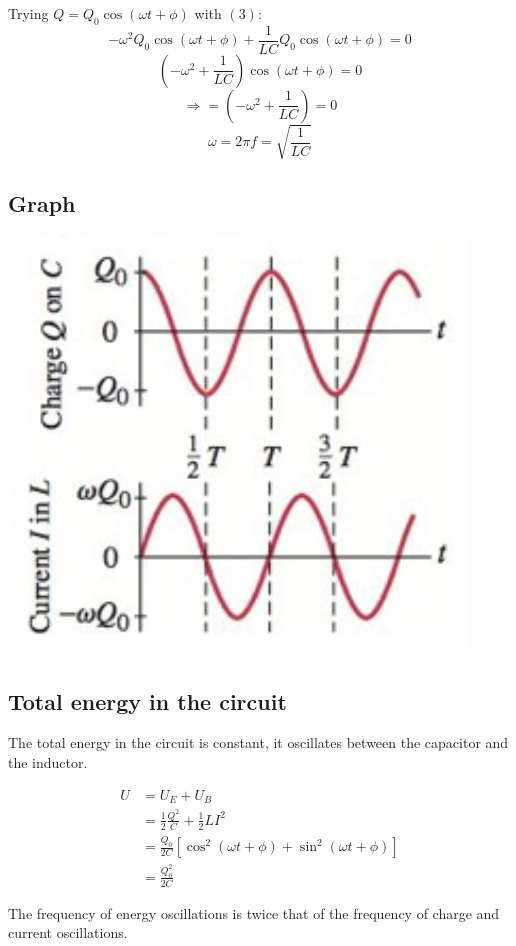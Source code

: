 \documentclass[11pt]{article}
\begin{document}
Trying \(Q = Q_0 \cos (\omega t + \phi)\) with \((3)\):
\[- \omega^2 Q_0 \cos (\omega t + \phi) + \frac{1}{LC} Q_0 \cos (\omega t + \phi) = 0\]
\[\left(- \omega^2 + \frac{1}{LC} \right) \cos ( \omega t + \phi ) = 0\]
\[\Longrightarrow = \left(- \omega^2 + \frac{1}{LC} \right) = 0\]
\[\omega = 2 \pi f = \sqrt{\frac{1}{LC}}\]
\subsection{Graph}
\label{sec:orgd357c95}

\begin{center}
\includegraphics[scale=0.8]{./images/lc-circuit-graph.png}
\end{center}
\subsection{Total energy in the circuit}
\label{sec:org576b350}
The total energy in the circuit is constant, it oscillates between the capacitor and the inductor.

\begin{align*}
U &= U_E + U_B \\
&= \frac{1}{2} \frac{Q^2}{C} + \frac{1}{2} LI^2 \\
&= \frac{Q_0}{2C} \left[\cos^2 (\omega t + \phi) + \sin^2 (\omega t + \phi) \right] \\
&= \frac{Q_0^2}{2C}
\end{align*}

The frequency of energy oscillations is twice that of the frequency of charge and current oscillations.
\end{document}

